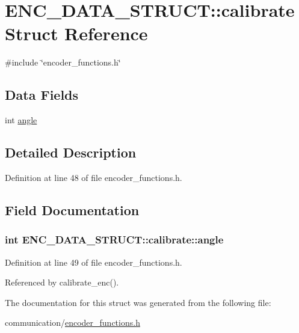 \hypertarget{structENC__DATA__STRUCT_1_1calibrate}{\section{E\-N\-C\-\_\-\-D\-A\-T\-A\-\_\-\-S\-T\-R\-U\-C\-T\-:\-:calibrate Struct Reference}
\label{structENC__DATA__STRUCT_1_1calibrate}
}


{\ttfamily \#include \char`\"{}encoder\-\_\-functions.\-h\char`\"{}}

\subsection*{Data Fields}
\begin{DoxyCompactItemize}
\item 
int \hyperlink{structENC__DATA__STRUCT_1_1calibrate_a862c7101db8c6dbc9213857b6bc1971b}{angle}
\end{DoxyCompactItemize}


\subsection{Detailed Description}


Definition at line 48 of file encoder\-\_\-functions.\-h.



\subsection{Field Documentation}
\hypertarget{structENC__DATA__STRUCT_1_1calibrate_a862c7101db8c6dbc9213857b6bc1971b}{
\subsubsection[{angle}]{\setlength{\rightskip}{0pt plus 5cm}int E\-N\-C\-\_\-\-D\-A\-T\-A\-\_\-\-S\-T\-R\-U\-C\-T\-::calibrate\-::angle}}\label{structENC__DATA__STRUCT_1_1calibrate_a862c7101db8c6dbc9213857b6bc1971b}


Definition at line 49 of file encoder\-\_\-functions.\-h.



Referenced by calibrate\-\_\-enc().



The documentation for this struct was generated from the following file\-:\begin{DoxyCompactItemize}
\item 
communication/\hyperlink{encoder__functions_8h}{encoder\-\_\-functions.\-h}\end{DoxyCompactItemize}
